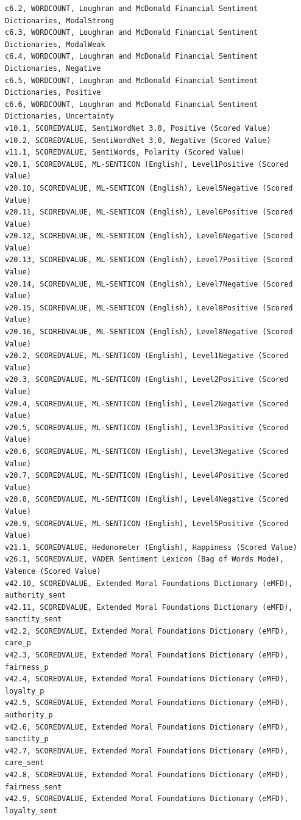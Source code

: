 \documentclass[12pt]{article}
\begin{document}
\begin{verbatim}
c6.2, WORDCOUNT, Loughran and McDonald Financial Sentiment Dictionaries, ModalStrong
c6.3, WORDCOUNT, Loughran and McDonald Financial Sentiment Dictionaries, ModalWeak
c6.4, WORDCOUNT, Loughran and McDonald Financial Sentiment Dictionaries, Negative
c6.5, WORDCOUNT, Loughran and McDonald Financial Sentiment Dictionaries, Positive
c6.6, WORDCOUNT, Loughran and McDonald Financial Sentiment Dictionaries, Uncertainty
v10.1, SCOREDVALUE, SentiWordNet 3.0, Positive (Scored Value)
v10.2, SCOREDVALUE, SentiWordNet 3.0, Negative (Scored Value)
v11.1, SCOREDVALUE, SentiWords, Polarity (Scored Value)
v20.1, SCOREDVALUE, ML-SENTICON (English), Level1Positive (Scored Value)
v20.10, SCOREDVALUE, ML-SENTICON (English), Level5Negative (Scored Value)
v20.11, SCOREDVALUE, ML-SENTICON (English), Level6Positive (Scored Value)
v20.12, SCOREDVALUE, ML-SENTICON (English), Level6Negative (Scored Value)
v20.13, SCOREDVALUE, ML-SENTICON (English), Level7Positive (Scored Value)
v20.14, SCOREDVALUE, ML-SENTICON (English), Level7Negative (Scored Value)
v20.15, SCOREDVALUE, ML-SENTICON (English), Level8Positive (Scored Value)
v20.16, SCOREDVALUE, ML-SENTICON (English), Level8Negative (Scored Value)
v20.2, SCOREDVALUE, ML-SENTICON (English), Level1Negative (Scored Value)
v20.3, SCOREDVALUE, ML-SENTICON (English), Level2Positive (Scored Value)
v20.4, SCOREDVALUE, ML-SENTICON (English), Level2Negative (Scored Value)
v20.5, SCOREDVALUE, ML-SENTICON (English), Level3Positive (Scored Value)
v20.6, SCOREDVALUE, ML-SENTICON (English), Level3Negative (Scored Value)
v20.7, SCOREDVALUE, ML-SENTICON (English), Level4Positive (Scored Value)
v20.8, SCOREDVALUE, ML-SENTICON (English), Level4Negative (Scored Value)
v20.9, SCOREDVALUE, ML-SENTICON (English), Level5Positive (Scored Value)
v21.1, SCOREDVALUE, Hedonometer (English), Happiness (Scored Value)
v26.1, SCOREDVALUE, VADER Sentiment Lexicon (Bag of Words Mode), Valence (Scored Value)
v42.10, SCOREDVALUE, Extended Moral Foundations Dictionary (eMFD), authority_sent
v42.11, SCOREDVALUE, Extended Moral Foundations Dictionary (eMFD), sanctity_sent
v42.2, SCOREDVALUE, Extended Moral Foundations Dictionary (eMFD), care_p
v42.3, SCOREDVALUE, Extended Moral Foundations Dictionary (eMFD), fairness_p
v42.4, SCOREDVALUE, Extended Moral Foundations Dictionary (eMFD), loyalty_p
v42.5, SCOREDVALUE, Extended Moral Foundations Dictionary (eMFD), authority_p
v42.6, SCOREDVALUE, Extended Moral Foundations Dictionary (eMFD), sanctity_p
v42.7, SCOREDVALUE, Extended Moral Foundations Dictionary (eMFD), care_sent
v42.8, SCOREDVALUE, Extended Moral Foundations Dictionary (eMFD), fairness_sent
v42.9, SCOREDVALUE, Extended Moral Foundations Dictionary (eMFD), loyalty_sent
\end{verbatim}
\end{document}
